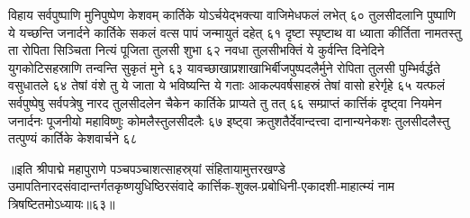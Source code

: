 विहाय सर्वपुष्पाणि मुनिपुष्पेण केशवम् 
कार्तिके योऽर्चयेद्भक्त्या वाजिमेधफलं लभेत् ६०
तुलसीदलानि पुष्पाणि ये यच्छन्ति जनार्दने 
कार्तिके सकलं वत्स पापं जन्मायुतं दहेत् ६१
दृष्टा स्पृष्टाथ वा ध्याता कीर्तिता नामतस्तु ता 
रोपिता सिञ्चिता नित्यं पूजिता तुलसी शुभा ६२
नवधा तुलसीभक्तिं ये कुर्वन्ति दिनेदिने 
युगकोटिसहस्राणि तन्वन्ति सुकृतं मुने ६३
यावच्छाखाप्रशाखाभिर्बीजपुष्पदलैर्मुने 
रोपिता तुलसी पुम्भिर्वर्द्धते वसुधातले ६४
तेषां वंशे तु ये जाता ये भविष्यन्ति ये गताः 
आकल्पवर्षसाहस्रं तेषां वासो हरेर्गृहे ६५
यत्फलं सर्वपुष्पेषु सर्वपत्रेषु नारद 
तुलसीदलेन चैकेन कार्तिके प्राप्यते तु तत् ६६
सम्प्राप्तं कार्त्तिकं दृष्ट्वा नियमेन जनार्दनः 
पूजनीयो महाविष्णुः कोमलैस्तुलसीदलैः ६७
इष्ट्वा क्रतुशतैर्देवान्दत्त्वा दानान्यनेकशः 
तुलसीदलैस्तु तत्पुण्यं कार्तिके केशवार्चने ६८

॥इति श्रीपाद्मे महापुराणे पञ्चपञ्चाशत्साहस्र्यां संहितायामुत्तरखण्डे उमापतिनारदसंवादान्तर्गतकृष्णयुधिष्ठिरसंवादे कार्त्तिक-शुक्ल-प्रबोधिनी-एकादशी-माहात्म्यं नाम त्रिषष्टितमोऽध्यायः॥६३॥



